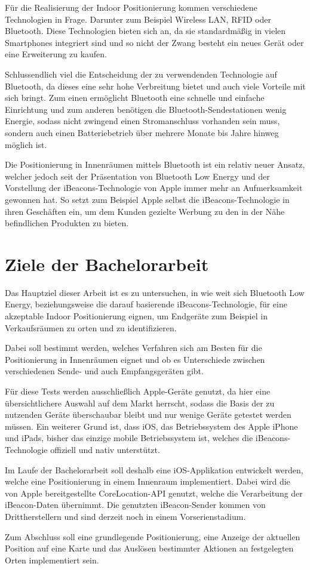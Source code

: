 Für die Realisierung der Indoor Positionierung kommen verschiedene Technologien in Frage. Darunter zum Beispiel Wireless LAN, RFID oder Bluetooth.
Diese Technologien bieten sich an, da sie standardmäßig in vielen Smartphones integriert sind und so nicht der Zwang besteht ein neues Gerät oder eine Erweiterung zu kaufen.


Schlussendlich viel die Entscheidung der zu verwendenden Technologie auf Bluetooth, da dieses eine sehr hohe Verbreitung bietet und auch viele Vorteile mit sich bringt. Zum einen ermöglicht Bluetooth eine schnelle und einfache Einrichtung und zum anderen benötigen die Bluetooth-Sendestationen wenig Energie, sodass nicht zwingend einen Stromanschluss vorhanden sein muss, sondern auch einen Batteriebetrieb über mehrere Monate bis Jahre hinweg möglich ist.

Die Positionierung in Innenräumen mittels Bluetooth ist ein relativ neuer Ansatz, welcher jedoch seit der Präsentation von Bluetooth Low Energy und der Vorstellung der iBeacons-Technologie von Apple immer mehr an Aufmerksamkeit gewonnen hat. So setzt zum Beispiel Apple selbst die iBeacons-Technologie in ihren Geschäften ein, um dem Kunden gezielte Werbung zu den in der Nähe befindlichen Produkten zu bieten.

\section{Ziele der Bachelorarbeit}
\label{sec:introduction:goal}


Das Hauptziel dieser Arbeit ist es zu untersuchen, in wie weit sich Bluetooth Low Energy, beziehungsweise die darauf basierende iBeacons-Technologie, für eine akzeptable Indoor Positionierung eignen, um Endgeräte zum Beispiel in Verkaufsräumen zu orten und zu identifizieren.

Dabei soll bestimmt werden, welches Verfahren sich am Besten für die Positionierung in Innenräumen eignet und ob es Unterschiede zwischen verschiedenen Sende- und auch Empfangsgeräten gibt.

Für diese Tests werden ausschließlich Apple-Geräte genutzt, da hier eine übersichtlichere Auswahl auf dem Markt herrscht, sodass die Basis der zu nutzenden Geräte überschaubar bleibt und nur wenige Geräte getestet werden müssen. Ein weiterer Grund ist, dass iOS, das Betriebssystem des Apple iPhone und iPads, bisher das einzige mobile Betriebssystem ist, welches die iBeacons-Technologie offiziell und nativ unterstützt.

Im Laufe der Bachelorarbeit soll deshalb eine iOS-Applikation entwickelt werden, welche eine Positionierung in einem Innenraum implementiert. Dabei wird die von Apple bereitgestellte CoreLocation-API genutzt, welche die Verarbeitung der iBeacon-Daten übernimmt. Die genutzten iBeacon-Sender kommen von Drittherstellern und sind derzeit noch in einem Vorserienstadium. 

Zum Abschluss soll eine grundlegende Positionierung, eine Anzeige der aktuellen Position auf eine Karte und das Auslösen bestimmter Aktionen an festgelegten Orten implementiert sein.



